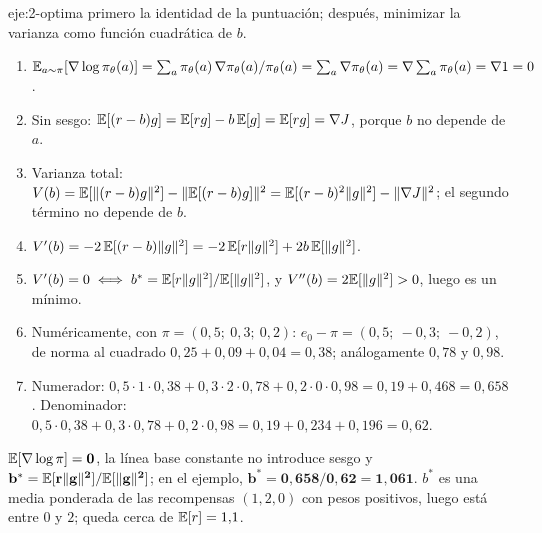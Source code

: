 \begin{solucion}{eje:2-optima}
\planteamiento primero la identidad de la puntuación; después, minimizar la varianza como función cuadrática de $b$.
\pasos
\begin{enumerate}[label=\arabic*.]
  \item $\mathbb{E}_{a\sim\pi}[\nabla\log\pi_\theta(a)]=\sum_a\pi_\theta(a)\,\nabla\pi_\theta(a)/\pi_\theta(a)=\sum_a\nabla\pi_\theta(a)=\nabla\sum_a\pi_\theta(a)=\nabla 1=0$.
  \item Sin sesgo: $\mathbb{E}[(r-b)g]=\mathbb{E}[rg]-b\,\mathbb{E}[g]=\mathbb{E}[rg]=\nabla J$, porque $b$ no depende de $a$.
  \item Varianza total: $V(b)=\mathbb{E}[\lVert(r-b)g\rVert^{2}]-\lVert\mathbb{E}[(r-b)g]\rVert^{2}=\mathbb{E}[(r-b)^{2}\lVert g\rVert^{2}]-\lVert\nabla J\rVert^{2}$; el segundo término no depende de $b$.
  \item $V'(b)=-2\,\mathbb{E}[(r-b)\lVert g\rVert^{2}]=-2\,\mathbb{E}[r\lVert g\rVert^{2}]+2b\,\mathbb{E}[\lVert g\rVert^{2}]$.
  \item $V'(b)=0\iff b^{*}=\mathbb{E}[r\lVert g\rVert^{2}]/\mathbb{E}[\lVert g\rVert^{2}]$, y $V''(b)=2\mathbb{E}[\lVert g\rVert^{2}]>0$, luego es un mínimo.
  \item Numéricamente, con $\pi=(0{,}5;\ 0{,}3;\ 0{,}2)$: $e_0-\pi=(0{,}5;\ -0{,}3;\ -0{,}2)$, de norma al cuadrado $0{,}25+0{,}09+0{,}04=0{,}38$; análogamente $0{,}78$ y $0{,}98$.
  \item Numerador: $0{,}5\cdot 1\cdot 0{,}38+0{,}3\cdot 2\cdot 0{,}78+0{,}2\cdot 0\cdot 0{,}98=0{,}19+0{,}468=0{,}658$. Denominador: $0{,}5\cdot 0{,}38+0{,}3\cdot 0{,}78+0{,}2\cdot 0{,}98=0{,}19+0{,}234+0{,}196=0{,}62$.
\end{enumerate}
\resultado $\mathbf{\mathbb{E}[\nabla\log\pi]=0}$, la línea base constante no introduce sesgo y $\mathbf{b^{*}=\mathbb{E}[r\lVert g\rVert^{2}]/\mathbb{E}[\lVert g\rVert^{2}]}$; en el ejemplo, $\mathbf{b^{*}=0{,}658/0{,}62=1{,}061}$.
\comprobacion $b^{*}$ es una media ponderada de las recompensas $(1,2,0)$ con pesos positivos, luego está entre $0$ y $2$; queda cerca de $\mathbb{E}[r]=1{,}1$.
\end{solucion}

